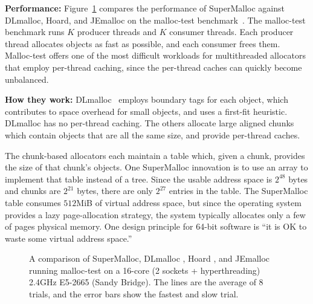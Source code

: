 \documentclass[pldi]{sigplanconf-pldi15}
\newcommand{\figref}[1]{Figure~\ref{fig:#1}}
\begin{document}
{\bf Performance:} \figref{data} compares the performance of
SuperMalloc against DLmalloc, Hoard, and JEmalloc on the malloc-test
benchmark~\cite{LeverBo00}.  The malloc-test benchmark runs $K$
producer threads and $K$ consumer threads.  Each producer thread
allocates objects as fast as possible, and each consumer frees them.
Malloc-test offers one of the most difficult workloads for
multithreaded allocators that employ per-thread caching, since the
per-thread caches can quickly become unbalanced.


{\bf How they work:} DLmalloc~\cite{Lea96} employs boundary tags for
each object, which contributes to space overhead for small objects,
and uses a first-fit heuristic.  DLmalloc has no per-thread caching.
The others allocate large aligned chunks which contain objects that
are all the same size, and provide per-thread caches.

The chunk-based allocators each maintain a table which, given a chunk,
provides the size of that chunk's objects.  One SuperMalloc innovation
is to use an array to implement that table instead of a tree. Since
the usable address space is $2^{48}$ bytes and chunks are $2^{21}$
bytes, there are only $2^{27}$ entries in the table.  The SuperMalloc
table consumes $512$MiB of virtual address space, but since the
operating system provides a lazy page-allocation strategy, the system
typically allocates only a few of pages physical memory.  One design
principle for 64-bit software is ``it is OK to waste some virtual
address space.''

\begin{figure}

\caption{A comparison of SuperMalloc, DLmalloc \cite{Lea96}, Hoard
  \cite{BergerMcBl00}, and JEmalloc~\cite{Evans06} running malloc-test
  on a 16-core (2 sockets + hyperthreading) 2.4GHz E5-2665 (Sandy
  Bridge).  The lines are the average of 8 trials, and the error bars
  show the fastest and slow trial.}
\label{fig:data}
\vspace*{-3ex}
\end{figure}

\end{document}

